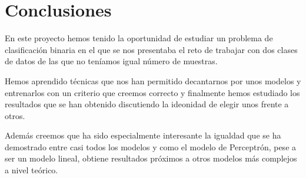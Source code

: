 \documentclass[11pt]{article}
\begin{document}
\section{Conclusiones}

En este proyecto hemos tenido la oportunidad de estudiar un problema de
clasificación binaria en el que se nos presentaba el reto de trabajar con 
dos clases de datos de las que no teníamos igual número de muestras. 

Hemos aprendido técnicas que nos han permitido decantarnos por unos modelos y
entrenarlos con un criterio que creemos correcto y finalmente hemos estudiado
los resultados que se han obtenido discutiendo la ideonidad de elegir unos
frente a otros. 

Además creemos que ha sido especialmente interesante la igualdad que se ha
demostrado entre casi todos los modelos y como el modelo de Perceptrón,
pese a ser un modelo lineal, obtiene resultados próximos a otros modelos más
complejos a nivel teórico.




%


\end{document}

